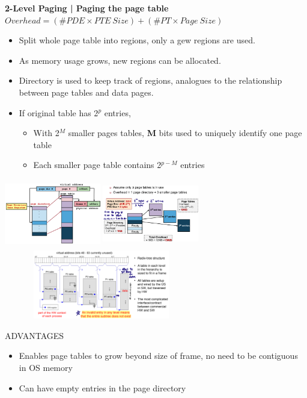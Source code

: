 \documentclass[10pt,landscape]{article}
\begin{document}
\begin{multicols*}{3}
\textbf{2-Level Paging | Paging the page table}
    \colorbox{yellow!80}{%
        $Overhead = (\# PDE \times PTE \ Size) + (
            \# PT \times Page \ Size)$
    }
\begin{itemize}[topsep=0pt,noitemsep,wide=0pt, leftmargin=\dimexpr{} + 2\relax]
    \item Split whole page table into regions, only a gew regions are used.
    \item As memory usage grows, new regions can be allocated.
    \item Directory is used to keep track of regions, analogues to the relationship between page tables and data pages.
    \item If original table has 2$^p$ entries,
    \begin{itemize}[topsep=0pt,noitemsep,wide=0pt, leftmargin=\dimexpr{} + 2\relax]
        \item With 2$^M$ smaller pages tables, \textbf{M} bits used to uniquely identify one page table
        \item Each smaller page table contains 2$^{p - M}$ entries
    \end{itemize}
\end{itemize}
\includegraphics[width=4.2cm, height=3cm]{images/2levelpaging.png}
\includegraphics[width=4.2cm, height=3cm]{images/advantages2levelpaging.png}
\includegraphics[width=8.5cm, height=3cm]{images/hierarchicalpagetable.png}

ADVANTAGES
\begin{itemize}[topsep=0pt,noitemsep,wide=0pt, leftmargin=\dimexpr{} + 2\relax]
    \item Enables page tables to grow beyond size of frame, no need to be contiguous in OS memory
    \item Can have empty entries in the page directory
\end{itemize}



\end{multicols*}
\end{document}
